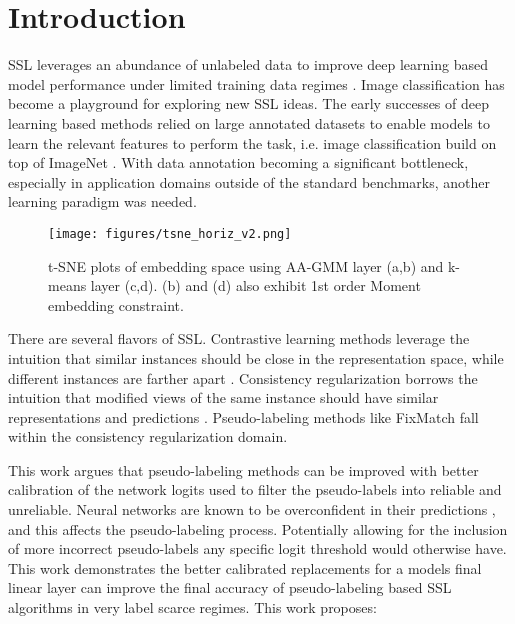\documentclass[10pt,twocolumn,letterpaper]{article}
\newcommand{\TODO}[1]{\textbf{\color{red}[TODO: #1]}}
\begin{document}
\section{Introduction}
SSL leverages an abundance of unlabeled data to improve deep learning based model performance under limited training data regimes \cite{zhu2022introduction,li2019safe,hady2013semi}.
Image classification has become a playground for exploring new SSL ideas.
The early successes of deep learning based methods relied on large annotated datasets to enable models to learn the relevant features to perform the task, i.e. image classification build on top of ImageNet \cite{deng2009imagenet}.
With data annotation becoming a significant bottleneck, especially in application domains outside of the standard benchmarks, another learning paradigm was needed.


\begin{figure*}[ht]
	\centering
	\texttt{[image: figures/tsne\_horiz\_v2.png]}
	\caption{t-SNE plots of embedding space using AA-GMM layer (a,b) and k-means layer (c,d).  (b) and (d) also exhibit 1st order Moment embedding constraint.  }
	
	\label{fig:schema}
\end{figure*}

There are several flavors of SSL.
Contrastive learning methods leverage the intuition that similar instances should be close in the representation space, while different instances are farther apart \cite{yang2022class,li2021comatch}.
Consistency regularization borrows the intuition that modified views of the same instance should have similar representations and predictions \cite{sohn2020fixmatch,lee2022contrastive,zhang2021flexmatch,kim2022conmatch}.
Pseudo-labeling methods like FixMatch \cite{sohn2020fixmatch} fall within the consistency regularization domain.

This work argues that pseudo-labeling methods can be improved with better calibration of the network logits used to filter the pseudo-labels into reliable and unreliable. 
Neural networks are known to be overconfident in their predictions \cite{wei2022mitigating}, and this affects the pseudo-labeling process. 
Potentially allowing for the inclusion of more incorrect pseudo-labels any specific logit threshold would otherwise have.
This work demonstrates the better calibrated replacements for a models final linear layer can improve the final accuracy of pseudo-labeling based SSL algorithms in very label scarce regimes. 
This work proposes:
\end{document}
